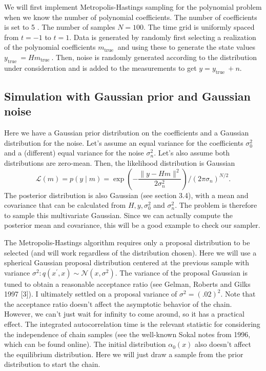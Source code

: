 \documentclass[11pt]{article}
\begin{document}
We will first implement Metropolis-Hastings sampling for the polynomial problem when we know the number of polynomial coefficients. The number of coefficients is set to 5 . The number of samples $N=100$. The time grid is uniformly spaced from $t=-1$ to $t=1$. Data is generated by randomly first selecting a realization of the polynomial coefficients $m_{\text {true }}$ and using these to generate the state values $y_{\text {true }}=H m_{\text {true }}$. Then, noise is randomly generated according to the distribution under consideration and is added to the measurements to get $y=y_{\text {true }}+n$.

\subsection{Simulation with Gaussian prior and Gaussian noise}

Here we have a Gaussian prior distribution on the coefficients and a Gaussian distribution for the noise. Let's assume an equal variance for the coefficients $\sigma_{0}^{2}$ and a (different) equal variance for the noise $\sigma_{n}^{2}$. Let's also assume both distributions are zero-mean. Then, the likelihood distribution is Gaussian
\begin{equation}
\mathcal{L}(m)=p(y \mid m)=\exp \left(-\frac{\|y-H m\|^{2}}{2 \sigma_{n}^{2}}\right) /\left(2 \pi \sigma_{n}\right)^{N / 2} .
\end{equation}
The posterior distribution is also Gaussian (see section 3.4), with a mean and covariance that can be calculated from $H, y, \sigma_{0}^{2}$ and $\sigma_{n}^{2}$. The problem is therefore to sample this multivariate Gaussian. Since we can actually compute the posterior mean and covariance, this will be a good example to check our sampler.

The Metropolis-Hastings algorithm requires only a proposal distribution to be selected (and will work regardless of the distribution chosen). Here we will use a spherical Gaussian proposal distribution centered at the previous sample with variance $\sigma^{2}: q\left(x^{\prime}, x\right) \sim \mathcal{N}\left(x, \sigma^{2}\right)$. The variance of the proposal Gaussian is tuned to obtain a reasonable acceptance ratio (see Gelman, Roberts and Gilks 1997 [3]). I ultimately settled on a proposal variance of $\sigma^{2}=(.02)^{2}$. Note that the acceptance ratio doesn't affect the asymptotic behavior of the chain. However, we can't just wait for infinity to come around, so it has a practical effect. The integrated autocorrelation time is the relevant statistic for considering the independence of chain samples (see the well-known Sokal notes from 1996, which can be found online). The initial distribution $\alpha_{0}(x)$ also doesn't affect the equilibrium distribution. Here we will just draw a sample from the prior distribution to start the chain.
\end{document}
